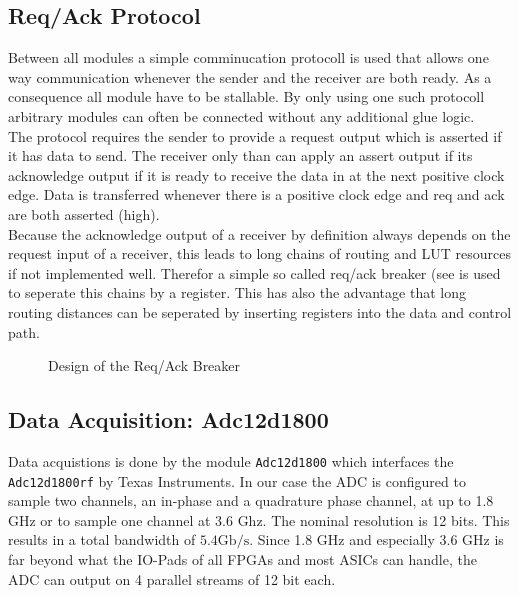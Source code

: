 \subsection{Req/Ack Protocol}
\label{sec:fpga_reqack}
Between all modules a simple comminucation protocoll is used that allows
one way communication whenever the sender and the receiver are both
ready. As a consequence all module have to be stallable. By only using
one such protocoll arbitrary modules can often be connected
without any additional glue logic. \\

The protocol requires the sender to provide a request output which
is asserted if it has data to send. The receiver only than can apply
an assert output if its acknowledge output if it is ready to receive
the data in at the next positive clock edge. Data is transferred whenever
there is a positive clock edge and req and ack are both asserted (high). \\

Because the acknowledge output of a receiver by definition always depends on the
request input of a receiver, this leads to long chains of routing and
\gls{LUT} resources if not implemented well. Therefor a simple so called
req/ack breaker (see  is used to seperate
this chains by a register.
This has also the advantage that long routing distances can be seperated by inserting
registers into the data and control path.


\begin{figure}[ht]
  \centering
  \caption{Design of the Req/Ack Breaker}
  \label{fig:fpga_reaack_breaker}
\end{figure}

\subsection{Data Acquisition: Adc12d1800}
Data acquistions is done by the module \verb|Adc12d1800| which interfaces
the \verb|Adc12d1800rf| by Texas Instruments. In our case the ADC is configured
to sample two channels, an in-phase and a quadrature phase channel, at up to 1.8 GHz
or to sample one channel at 3.6 Ghz. The nominal resolution is 12 bits.
This results in a total bandwidth of $5.4 \text{Gb}/\text{s}$.
Since 1.8 GHz and especially 3.6 GHz is far beyond what the IO-Pads of all
\glspl{FPGA}  and most \glspl{ASIC} can handle,
the ADC can output on 4 parallel streams of 12 bit each. \\

